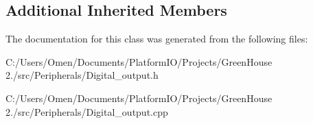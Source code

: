 \subsection*{Additional Inherited Members}


The documentation for this class was generated from the following files\+:\begin{DoxyCompactItemize}
\item 
C\+:/\+Users/\+Omen/\+Documents/\+Platform\+I\+O/\+Projects/\+Green\+House 2./src/\+Peripherals/Digital\+\_\+output.\+h\item 
C\+:/\+Users/\+Omen/\+Documents/\+Platform\+I\+O/\+Projects/\+Green\+House 2./src/\+Peripherals/Digital\+\_\+output.\+cpp\end{DoxyCompactItemize}

